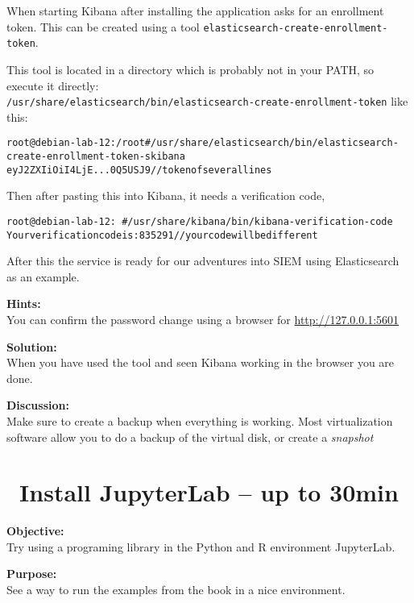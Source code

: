 \documentclass[a4paper,11pt,notitlepage]{report}
\begin{document}
When starting Kibana after installing the application asks for an enrollment token. This can be created using a tool \verb+elasticsearch-create-enrollment-token+.

This tool is located in a directory which is probably not in your PATH, so execute it directly:\\
\verb+/usr/share/elasticsearch/bin/elasticsearch-create-enrollment-token+ like this:


\begin{alltt}
root@debian-lab-12:/root# /usr/share/elasticsearch/bin/elasticsearch-create-enrollment-token -s kibana
eyJ2ZXIiOiI4LjE...0Q5USJ9 // token of several lines
\end{alltt}

Then after pasting this into Kibana, it needs a verification code,

\begin{alltt}
root@debian-lab-12:~# /usr/share/kibana/bin/kibana-verification-code
Your verification code is:  835 291 // your code will be different
\end{alltt}

After this the service is ready for our adventures into SIEM using Elasticsearch as an example.

{\bf Hints:}\\
You can confirm the password change using a browser for \url{http://127.0.0.1:5601}


{\bf Solution:}\\
When you have used the tool and seen Kibana working in the browser you are done.

{\bf Discussion:}\\
{\LARGE Make sure to create a backup when everything is working. Most virtualization software allow you to do a backup of the virtual disk, or create a \emph{snapshot}}


\chapter{\faInfoCircle\ Install JupyterLab -- up to 30min}
\label{ex-python-Jupyterlab}


{\bf Objective:}\\
Try using a programing library in the Python and R environment JupyterLab.

{\bf Purpose:}\\
See a way to run the examples from the book in a nice environment.
\end{document}
